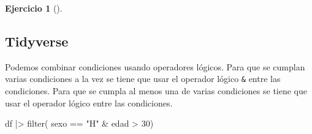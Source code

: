 \documentclass[
  a4paper,
]{scrreport}
\newenvironment{Shaded}{\begin{snugshade}}{\end{snugshade}}
\newcommand{\DecValTok}[1]{\textcolor[rgb]{0.68,0.00,0.00}{#1}}
\newcommand{\FunctionTok}[1]{\textcolor[rgb]{0.28,0.35,0.67}{#1}}
\newcommand{\NormalTok}[1]{\textcolor[rgb]{0.00,0.23,0.31}{#1}}
\newcommand{\SpecialCharTok}[1]{\textcolor[rgb]{0.37,0.37,0.37}{#1}}
\newcommand{\StringTok}[1]{\textcolor[rgb]{0.13,0.47,0.30}{#1}}
\theoremstyle{definition}
\newtheorem{exercise}{Ejercicio}[chapter]
\theoremstyle{remark}
\begin{document}
\begin{exercise}[]
\begin{enumerate}
\begin{tcolorbox}
  \section{Tidyverse}

  Podemos combinar condiciones usando operadores lógicos. Para que se
  cumplan varias condiciones a la vez se tiene que usar el operador
  lógico \texttt{\&} entre las condiciones. Para que se cumpla al menos
  una de varias condiciones se tiene que usar el operador lógico
  \texttt{\textbar{}} entre las condiciones.

\begin{Shaded}
\begin{Highlighting}[]
\NormalTok{df }\SpecialCharTok{|\textgreater{}} \FunctionTok{filter}\NormalTok{( sexo }\SpecialCharTok{==} \StringTok{"H"} \SpecialCharTok{\&}\NormalTok{ edad }\SpecialCharTok{\textgreater{}} \DecValTok{30}\NormalTok{)}
\end{Highlighting}
\end{Shaded}


\end{tcolorbox}
\end{enumerate}
\end{exercise}
\end{document}

